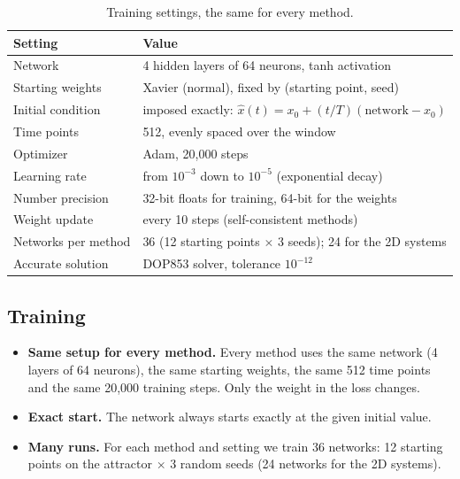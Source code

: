 \documentclass[11pt,a4paper]{article}
\begin{document}
\begin{table}[H]\centering
\caption{Training settings, the same for every method.}
\begin{tabular}{ll}\toprule
Setting & Value\\\midrule
Network & 4 hidden layers of 64 neurons, tanh activation\\
Starting weights & Xavier (normal), fixed by (starting point, seed)\\
Initial condition & imposed exactly: $\hat x(t)=x_0+(t/T)(\text{network}-x_0)$\\
Time points & 512, evenly spaced over the window\\
Optimizer & Adam, 20{,}000 steps\\
Learning rate & from $10^{-3}$ down to $10^{-5}$ (exponential decay)\\
Number precision & 32-bit floats for training, 64-bit for the weights\\
Weight update & every 10 steps (self-consistent methods)\\
Networks per method & 36 (12 starting points $\times$ 3 seeds); 24 for the 2D systems\\
Accurate solution & DOP853 solver, tolerance $10^{-12}$\\\bottomrule
\end{tabular}
\end{table}

\subsection{Training}
\begin{itemize}
\item \textbf{Same setup for every method.} Every method uses the same network (4 layers of
  64 neurons), the same starting weights, the same 512 time points and the same 20{,}000
  training steps. Only the weight in the loss changes.
\item \textbf{Exact start.} The network always starts exactly at the given initial value.
\item \textbf{Many runs.} For each method and setting we train 36 networks: 12 starting
  points on the attractor $\times$ 3 random seeds (24 networks for the 2D systems).
\end{itemize}
\end{document}
